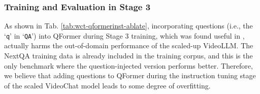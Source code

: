 \begin{table}[!tp]
    \vspace{-3mm}
    \caption{
        Ablation on using qformer instruction in Stage3 training of Chat-Centric Model.
    }
    \centering
    \small
    \vspace{-3mm}
    \label{tab:wct-qformerinst-ablate}
\end{table}

\subsubsection{Training and Evaluation in Stage 3}
As shown in Tab. \ref{tab:wct-qformerinst-ablate}, incorporating questions (i.e., the `\texttt{q}' in `\texttt{QA}') into QFormer during Stage 3 training, which was found useful in \cite{instructblip}, actually harms the out-of-domain performance of the scaled-up VideoLLM. The NextQA training data is already included in the training corpus, and this is the only benchmark where the question-injected version performs better. Therefore, we believe that adding questions to QFormer during the instruction tuning stage of the scaled VideoChat model leads to some degree of overfitting.
